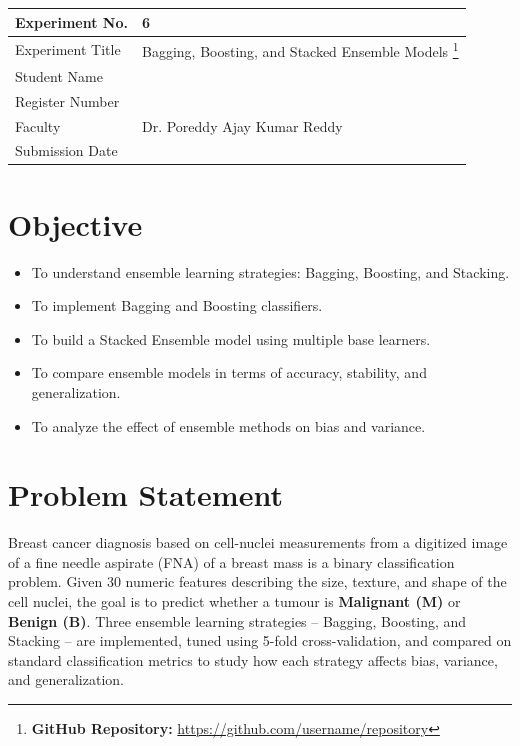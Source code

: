 \documentclass[12pt,a4paper]{article}
\begin{document}
\begin{tabular}{|p{4cm}|p{11cm}|}
\hline
Experiment No. & 6 \\ \hline
Experiment Title & Bagging, Boosting, and Stacked Ensemble Models
\footnote{\textbf{GitHub Repository: }\url{https://github.com/username/repository}}\\ \hline
Student Name & \\ \hline
Register Number & \\ \hline
Faculty & Dr. Poreddy Ajay Kumar Reddy \\ \hline
Submission Date & \\ \hline
\end{tabular}

\section{Objective}
\begin{itemize}[nosep]
\item To understand ensemble learning strategies: Bagging, Boosting, and Stacking.
\item To implement Bagging and Boosting classifiers.
\item To build a Stacked Ensemble model using multiple base learners.
\item To compare ensemble models in terms of accuracy, stability, and generalization.
\item To analyze the effect of ensemble methods on bias and variance.
\end{itemize}

\section{Problem Statement}
Breast cancer diagnosis based on cell-nuclei measurements from a digitized image of a fine
needle aspirate (FNA) of a breast mass is a binary classification problem. Given 30 numeric
features describing the size, texture, and shape of the cell nuclei, the goal is to predict
whether a tumour is \textbf{Malignant (M)} or \textbf{Benign (B)}. Three ensemble learning
strategies -- Bagging, Boosting, and Stacking -- are implemented, tuned using 5-fold
cross-validation, and compared on standard classification metrics to study how each strategy
affects bias, variance, and generalization.
\end{document}
